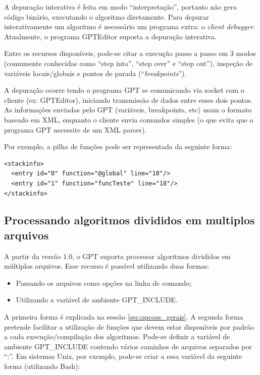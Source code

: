 \documentclass[a4paper,11pt]{report}
\begin{document}
A depuração interativa é feita em modo ``interpretação'', portanto não gera
código binário, executando o algoritmo diretamente. Para depurar interativamente
um algoritmo é necessário um programa extra: o \textit{client debugger}.
Atualmente, o programa GPTEditor suporta a depuração interativa.

Entre os recursos disponíveis, pode-se citar a execução passo a passo em 3 modos
(comumente conhecidas como ``step into'', ``step over'' e ``step out''),
inspeção de variáveis locais/globais e pontos de parada
(``\textit{breakpoints}'').

A depuração ocorre tendo o programa GPT se comunicando via socket com o cliente
(ex: GPTEditor), iniciando transmissão de dados entre esses dois pontos. As
informações enviadas pelo GPT (variáveis, breakpoints, etc) usam o formato
baseado em XML, enquanto o cliente envia comandos simples (o que evita que o
programa GPT necessite de um XML parser).

Por exemplo, a pilha de funções pode ser representada da seguinte forma:

\begin{verbatim}
<stackinfo>
  <entry id="0" function="@global" line="10"/>
  <entry id="1" function="funcTeste" line="18"/>
</stackinfo>
\end{verbatim}

\subsection{Processando algoritmos divididos em multiplos arquivos}

A partir da versão 1.0, o GPT suporta processar algoritmos divididos em
múltiplos arquivos. Esse recurso é possível utilizando duas formas:

\begin{itemize}
  \item Passando os arquivos como opções na linha de comando;
  \item Utilizando a variável de ambiente GPT\_INCLUDE.
\end{itemize}

A primeira forma é explicada na sessão
\ref{sec:opcoes_gerais}. A segunda forma pretende
facilitar a utilização de funções que devem estar disponíveis por padrão a cada
execução/compilação dos algoritmos. Pode-se definir a variável de ambiente
GPT\_INCLUDE contendo vários caminhos de arquivos separados por ``:''. Em
sistemas Unix, por exemplo, pode-se criar a essa variável da seguinte forma
(utilizando Bash):
\end{document}
